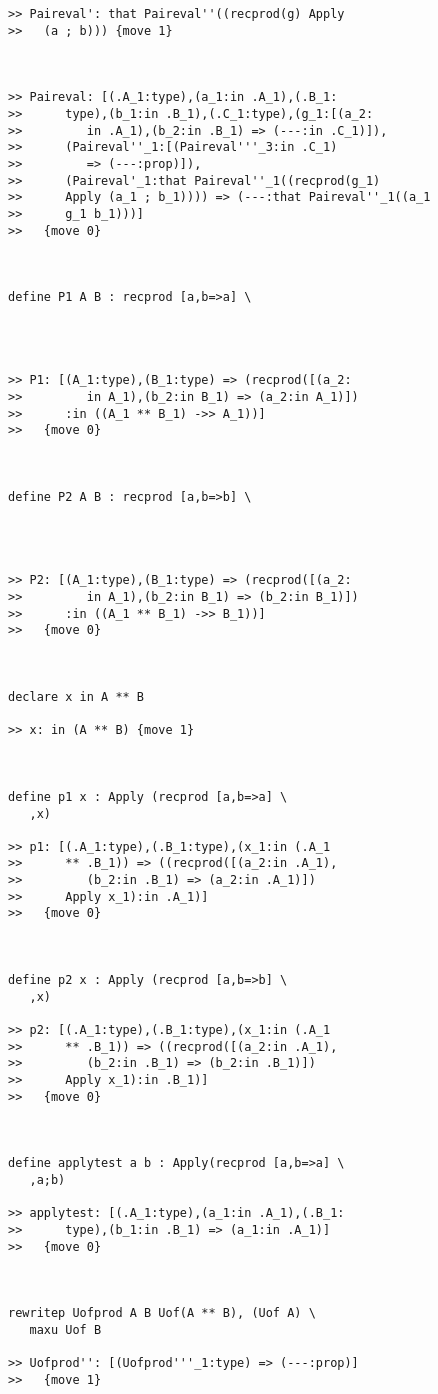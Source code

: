 \documentclass{article}
\begin{document}
\begin{verbatim}
>> Paireval': that Paireval''((recprod(g) Apply
>>   (a ; b))) {move 1}



>> Paireval: [(.A_1:type),(a_1:in .A_1),(.B_1:
>>      type),(b_1:in .B_1),(.C_1:type),(g_1:[(a_2:
>>         in .A_1),(b_2:in .B_1) => (---:in .C_1)]),
>>      (Paireval''_1:[(Paireval'''_3:in .C_1)
>>         => (---:prop)]),
>>      (Paireval'_1:that Paireval''_1((recprod(g_1)
>>      Apply (a_1 ; b_1)))) => (---:that Paireval''_1((a_1
>>      g_1 b_1)))]
>>   {move 0}



define P1 A B : recprod [a,b=>a] \
   



>> P1: [(A_1:type),(B_1:type) => (recprod([(a_2:
>>         in A_1),(b_2:in B_1) => (a_2:in A_1)])
>>      :in ((A_1 ** B_1) ->> A_1))]
>>   {move 0}



define P2 A B : recprod [a,b=>b] \
   



>> P2: [(A_1:type),(B_1:type) => (recprod([(a_2:
>>         in A_1),(b_2:in B_1) => (b_2:in B_1)])
>>      :in ((A_1 ** B_1) ->> B_1))]
>>   {move 0}



declare x in A ** B

>> x: in (A ** B) {move 1}



define p1 x : Apply (recprod [a,b=>a] \
   ,x)

>> p1: [(.A_1:type),(.B_1:type),(x_1:in (.A_1
>>      ** .B_1)) => ((recprod([(a_2:in .A_1),
>>         (b_2:in .B_1) => (a_2:in .A_1)])
>>      Apply x_1):in .A_1)]
>>   {move 0}



define p2 x : Apply (recprod [a,b=>b] \
   ,x)

>> p2: [(.A_1:type),(.B_1:type),(x_1:in (.A_1
>>      ** .B_1)) => ((recprod([(a_2:in .A_1),
>>         (b_2:in .B_1) => (b_2:in .B_1)])
>>      Apply x_1):in .B_1)]
>>   {move 0}



define applytest a b : Apply(recprod [a,b=>a] \
   ,a;b)

>> applytest: [(.A_1:type),(a_1:in .A_1),(.B_1:
>>      type),(b_1:in .B_1) => (a_1:in .A_1)]
>>   {move 0}



rewritep Uofprod A B Uof(A ** B), (Uof A) \
   maxu Uof B

>> Uofprod'': [(Uofprod'''_1:type) => (---:prop)]
>>   {move 1}




\end{verbatim}
\end{document}

